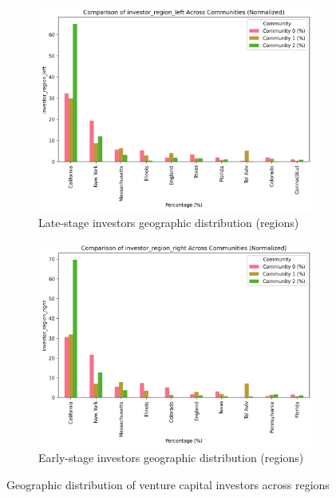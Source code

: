 \begin{figure}[htp]
\centering
\begin{subfigure}{0.8\textwidth}
    \centering
    \includegraphics[width=1\textwidth]{../figures/us/categorical_comparison_investor_region_left.png}
    \caption{Late-stage investors geographic distribution (regions)}
    \label{fig:late_stage_geo}
\end{subfigure}

\vspace{0.5em}

\begin{subfigure}{0.8\textwidth}
    \centering
    \includegraphics[width=1\textwidth]{../figures/us/categorical_comparison_investor_region_right.png}
    \caption{Early-stage investors geographic distribution (regions)}
    \label{fig:early_stage_geo}
\end{subfigure}
\caption{Geographic distribution of venture capital investors across regions}
\label{fig:geographic_distribution}
\end{figure}


